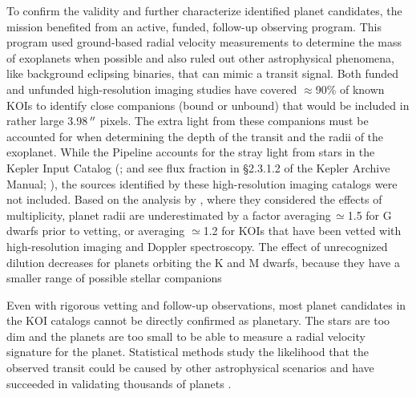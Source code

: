 To confirm the validity and further characterize identified planet candidates, the \Kepler{} mission benefited from an active, funded, follow-up observing program. This program used ground-based radial velocity measurements to determine the mass of exoplanets \citep[e.g.,][]{Marcy2014} when possible and also ruled out other astrophysical phenomena, like background eclipsing binaries, that can mimic a transit signal.  Both funded and unfunded high-resolution imaging studies have covered $\approx$90\% of known KOIs \citep[see e.g.,][]{Furlan2017,Law2014,Barnec2016,Ziegler2017} to identify close companions (bound or unbound) that would be included in  rather large 3.98\,$\mbox{$^{\prime\prime}$}$ pixels.  The extra light from these companions must be accounted for when determining the depth of the transit and the radii of the exoplanet.  While the \Kepler{} Pipeline accounts for the stray light from stars in the Kepler Input Catalog (\citealt{Brown2011}; and see flux fraction in \S2.3.1.2 of the Kepler Archive Manual; \citealt{Thompson2016KAM}), the sources identified by these high-resolution imaging catalogs were not included.  Based on the analysis by \citet{Ciardi2015}, where they considered the effects of multiplicity, planet radii are underestimated by a factor averaging\,$\simeq$1.5 for G dwarfs prior to vetting, or averaging $\simeq$1.2 for KOIs that have been vetted with high-resolution imaging and Doppler spectroscopy.  The effect of unrecognized dilution decreases for planets orbiting the K and M dwarfs, because they have a smaller range of possible stellar companions


Even with rigorous vetting and follow-up observations, most planet candidates in the KOI catalogs cannot be directly confirmed as planetary. The stars are too dim and the planets are too small to be able to measure a radial velocity signature for the planet.   Statistical methods study the likelihood that the observed transit could be caused by other astrophysical scenarios and have succeeded in validating thousands of \Kepler{} planets \citep[e.g.][]{Morton2016,Torres2015,Rowe2014,Lissauer2014}.  

